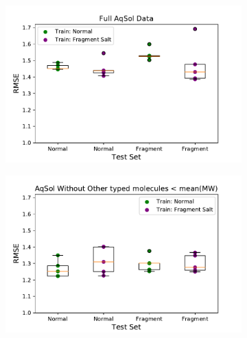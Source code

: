 \documentclass[journal=jmcmar,manuscript=article]{achemso}
\begin{document}
\begin{figure}[tb]
    \centering
    \begin{subfigure}[t]{0.48\textwidth}
        \centering
        \includegraphics[width=\linewidth]{figures/full_saltfragfirst_RMSEs_boxplots.pdf}
    \end{subfigure}%
    \hfill
    \begin{subfigure}[t]{0.48\textwidth}
        \centering
        \includegraphics[width=\linewidth]{figures/othersMW_saltfragfirst_RMSEs_boxplots.pdf}
    \end{subfigure}
    

\end{figure}
\end{document}
